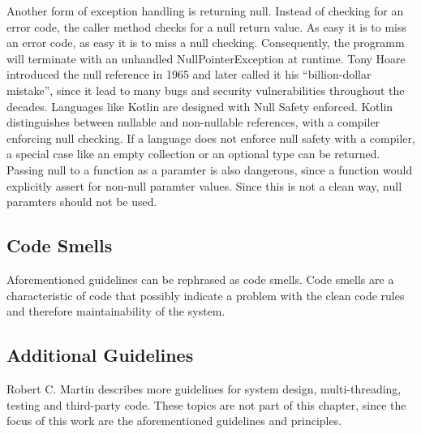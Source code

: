 Another form of exception handling is returning null. Instead of checking for an error code, the caller method checks for a null return value. As easy it is to miss an error code, as easy it is to miss a null checking. Consequently, the programm will terminate with an unhandled NullPointerException at runtime. Tony Hoare introduced the null reference in 1965 and later called it his \enquote{billion-dollar mistake}\cite{hoare_null_2009}, since it lead to many bugs and security vulnerabilities throughout the decades. Languages like Kotlin are designed with Null Safety enforced. Kotlin distinguishes between nullable and non-nullable references, with a compiler enforcing null checking\cite{noauthor_null_nodate}. If a language does not enforce null safety with a compiler, a special case like an empty collection or an optional type can be returned. Passing null to a function as a paramter is also dangerous, since a function would explicitly assert for non-null paramter values. Since this is not a clean way, null paramters should not be used.

\subsection{Code Smells}
Aforementioned guidelines can be rephrased as code smells. Code smells are a characteristic of code that possibly indicate a problem with the clean code rules and therefore maintainability of the system.

\subsection{Additional Guidelines}
Robert C. Martin describes more guidelines for system design, multi-threading, testing and third-party code\cite{martin_clean_2009}. These topics are not part of this chapter, since the focus of this work are the aforementioned guidelines and principles. 


